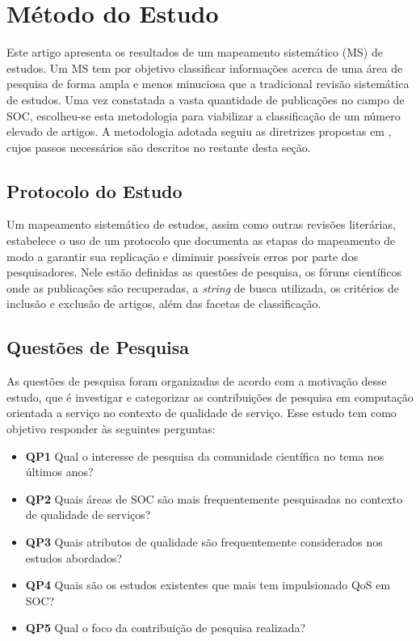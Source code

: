 
\section{Método do Estudo}\label{sec:review_method}

Este artigo apresenta os resultados de um mapeamento sistemático (MS) de estudos. Um MS tem por objetivo classificar informações acerca de uma área de pesquisa de forma ampla e menos minuciosa que a tradicional revisão sistemática de estudos. Uma vez constatada a vasta quantidade de publicações no campo de SOC, escolheu-se esta metodologia para viabilizar a classifica\c c\~{a}o de um número elevado de artigos. A metodologia adotada seguiu as diretrizes propostas em \cite{petersen:sms2008}, cujos passos necess\'{a}rios s\~{a}o descritos no restante desta se\c c\~{a}o.

\subsection{Protocolo do Estudo}

Um mapeamento sistemático de estudos, assim como outras revisões literárias, estabelece o uso de um protocolo que documenta as etapas do mapeamento de modo a garantir sua replicação e diminuir possíveis erros por parte dos pesquisadores. Nele estão definidas as questões de pesquisa, os fóruns científicos onde as publicações s\~{a}o recuperadas, a \textit{string} de busca utilizada, os critérios de inclusão e exclusão de artigos, além das facetas de classificação.

\subsection{Quest\~{o}es de Pesquisa}\label{sec:questoesPesquisa}

As questões de pesquisa foram organizadas de acordo com a motivação desse estudo, que é investigar e categorizar as contribuições de pesquisa em computação orientada a serviço no contexto de qualidade de serviço. Esse estudo tem como objetivo responder às seguintes perguntas: 

\begin{itemize}
\item {\bf QP1} Qual o interesse de pesquisa da comunidade científica no tema nos \'{u}ltimos anos? 
\item {\bf QP2} Quais áreas de SOC são mais frequentemente pesquisadas no contexto de qualidade de serviços?
\item {\bf QP3} Quais atributos de qualidade são frequentemente considerados nos estudos abordados? 
\item {\bf QP4} Quais s\~{a}o os estudos existentes que mais tem impulsionado QoS em SOC?
\item {\bf QP5} Qual o foco da contribuição de pesquisa realizada?   
\end{itemize}

